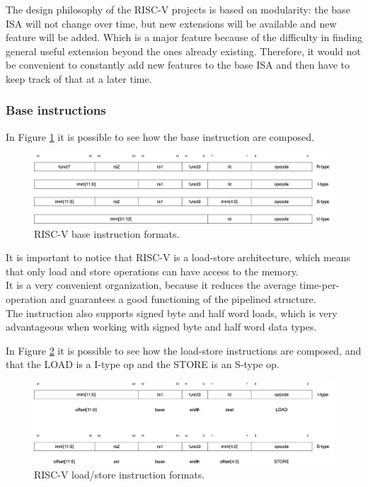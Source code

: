 The design philosophy of the RISC-V projects is based on modularity: the base ISA will not change over time, but new extensions will be available and new feature will be added. Which is a major feature because of the difficulty in finding general useful extension beyond the ones already existing. Therefore, it would not be convenient to constantly add new features to the base ISA and then have to keep track of that at a later time.\\


\subsubsection{Base instructions}
In Figure \ref{riscv-base-instruction-formats} it is possible to see how the base instruction are composed.

\begin{figure}[H]
    \centering
    \includegraphics[scale = 0.27]{Chapter_1/img/riscv-base-instruction-formats.png}
    \caption{RISC-V base instruction formats. \cite{RISC-V-Instruction-Set-Manual}}
    \label{riscv-base-instruction-formats}
\end{figure}

It is important to notice that RISC-V is a load-store architecture, which means that only load and store operations can have access to the memory.\\
It is a very convenient organization, because it reduces the average time-per-operation and guarantees a good functioning of the pipelined structure.\\

The instruction also supports signed byte and half word loads, which is very advantageous when working with signed byte and half word data types.

In Figure \ref{riscv-load-store} it is possible to see how the load-store instructions are composed, and that the LOAD is a I-type op and the STORE is an S-type op.

\begin{figure}[H]
    \centering
    \includegraphics[scale = 0.27]{Chapter_1/img/riscv-load-store.png}
    \caption{RISC-V load/store instruction formats. \cite{RISC-V-Instruction-Set-Manual}}
    \label{riscv-load-store}
\end{figure}


